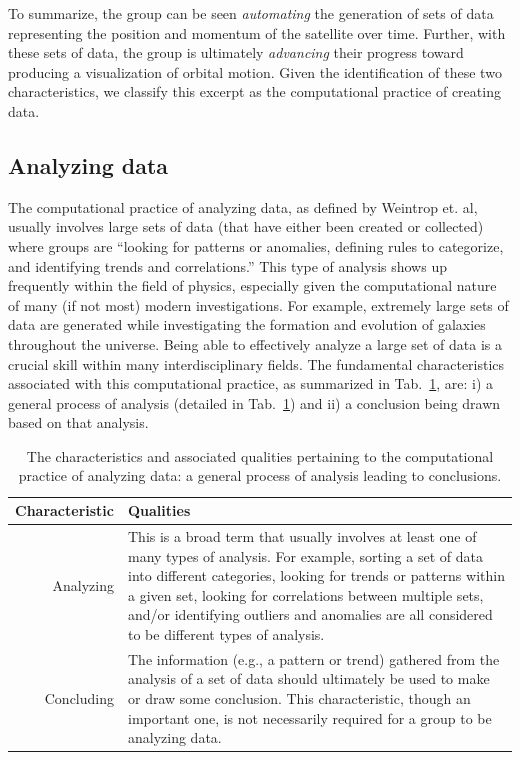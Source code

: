 \documentclass{msuphddissertation}
\begin{document}
\begin{doublespace}
To summarize, the group can be seen \textit{automating} the generation of sets of data representing the position and momentum of the satellite over time.  Further, with these sets of data, the group is ultimately \textit{advancing} their progress toward producing a visualization of orbital motion.  Given the identification of these two characteristics, we classify this excerpt as the computational practice of creating data.

%
%
%
%
%
%
%
%
%
%
%
%
%
%
%
%

\subsection{Analyzing data}

The computational practice of analyzing data, as defined by Weintrop et. al, usually involves large sets of data (that have either been created or collected) where groups are ``looking for patterns or anomalies, defining rules to categorize, and identifying trends and correlations.''  This type of analysis shows up frequently within the field of physics, especially given the computational nature of many (if not most) modern investigations.  For example, extremely large sets of data are generated while investigating the formation and evolution of galaxies throughout the universe.  Being able to effectively analyze a large set of data is a crucial skill within many interdisciplinary fields.  The fundamental characteristics associated with this computational practice, as summarized in Tab.~\ref{CH5:AnalyzingData}, are: i) a general process of analysis (detailed in Tab.~\ref{CH5:AnalyzingData}) and ii) a conclusion being drawn based on that analysis.

\begin{table}
\begin{tabular}{r|p{}}
Characteristic & Qualities \\\hline\hline
Analyzing & This is a broad term that usually involves at least one of many types of analysis.  For example, sorting a set of data into different categories, looking for trends or patterns within a given set, looking for correlations between multiple sets, and/or identifying outliers and anomalies are all considered to be different types of analysis.\\
Concluding & The information (e.g., a pattern or trend) gathered from the analysis of a set of data should ultimately be used to make or draw some conclusion.  This characteristic, though an important one, is not necessarily required for a group to be analyzing data.\\
\end{tabular}\caption{The characteristics and associated qualities pertaining to the computational practice of analyzing data: a general process of analysis leading to conclusions.}\label{CH5:AnalyzingData}
\end{table}


\end{doublespace}
\end{document}
